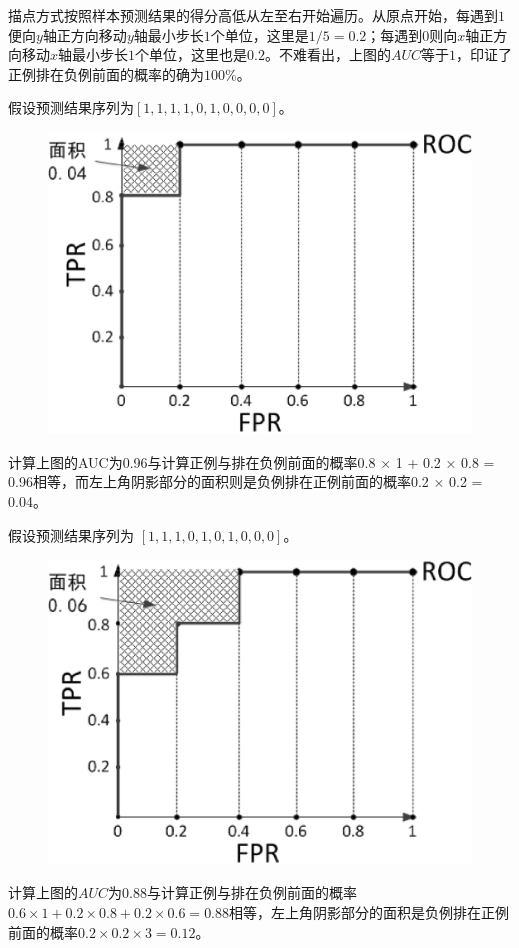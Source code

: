描点方式按照样本预测结果的得分高低从左至右开始遍历。从原点开始，每遇到$1$便向$y$轴正方向移动$y$轴最小步长$1$个单位，这里是$1/5=0.2$；每遇到$0$则向$x$轴正方向移动$x$轴最小步长$1$个单位，这里也是$0.2$。不难看出，上图的$AUC$等于$1$，印证了正例排在负例前面的概率的确为$100\%$。

假设预测结果序列为$[1, 1, 1, 1, 0, 1, 0, 0, 0, 0]$。

 \begin{figure}[h]
   \centering
   \includegraphics[width=.7\textwidth]{imgs/2.16.17-2.eps}
 \end{figure}

计算上图的AUC为0.96与计算正例与排在负例前面的概率0.8 × 1 + 0.2 × 0.8 = 0.96相等，而左上角阴影部分的面积则是负例排在正例前面的概率0.2 × 0.2 = 0.04。


假设预测结果序列为 $[1, 1, 1, 0, 1, 0, 1, 0, 0, 0]$。

 \begin{figure}[h]
   \centering
   \includegraphics[width=.7\textwidth]{imgs/2.16.17-3.eps}
 \end{figure}


计算上图的$AUC$为$0.88$与计算正例与排在负例前面的概率$0.6 \times 1 + 0.2 \times 0.8 + 0.2 \times 0.6 = 0.88$相等，左上角阴影部分的面积是负例排在正例前面的概率$0.2 \times 0.2 \times 3 = 0.12$。

